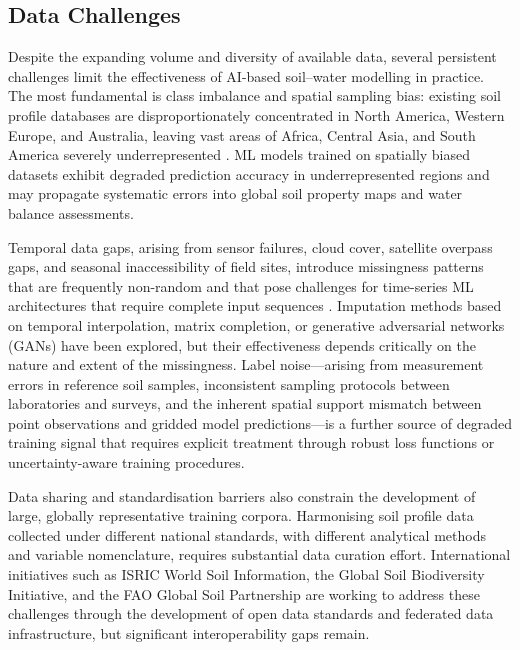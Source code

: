 \documentclass[land,article,submit,pdftex,moreauthors]{Definitions/mdpi}
\numberwithin{equation}{section}
\begin{document}
\subsection{Data Challenges}

Despite the expanding volume and diversity of available data, several persistent challenges limit the effectiveness of AI-based soil--water modelling in practice. The most fundamental is class imbalance and spatial sampling bias: existing soil profile databases are disproportionately concentrated in North America, Western Europe, and Australia, leaving vast areas of Africa, Central Asia, and South America severely underrepresented \citep{hengl2017soilgrids250m}. ML models trained on spatially biased datasets exhibit degraded prediction accuracy in underrepresented regions and may propagate systematic errors into global soil property maps and water balance assessments.

Temporal data gaps, arising from sensor failures, cloud cover, satellite overpass gaps, and seasonal inaccessibility of field sites, introduce missingness patterns that are frequently non-random and that pose challenges for time-series ML architectures that require complete input sequences \citep{gruber2020}. Imputation methods based on temporal interpolation, matrix completion, or generative adversarial networks (GANs) have been explored, but their effectiveness depends critically on the nature and extent of the missingness. Label noise---arising from measurement errors in reference soil samples, inconsistent sampling protocols between laboratories and surveys, and the inherent spatial support mismatch between point observations and gridded model predictions---is a further source of degraded training signal that requires explicit treatment through robust loss functions or uncertainty-aware training procedures.

Data sharing and standardisation barriers also constrain the development of large, globally representative training corpora. Harmonising soil profile data collected under different national standards, with different analytical methods and variable nomenclature, requires substantial data curation effort. International initiatives such as ISRIC World Soil Information, the Global Soil Biodiversity Initiative, and the FAO Global Soil Partnership are working to address these challenges through the development of open data standards and federated data infrastructure, but significant interoperability gaps remain.
\end{document}
